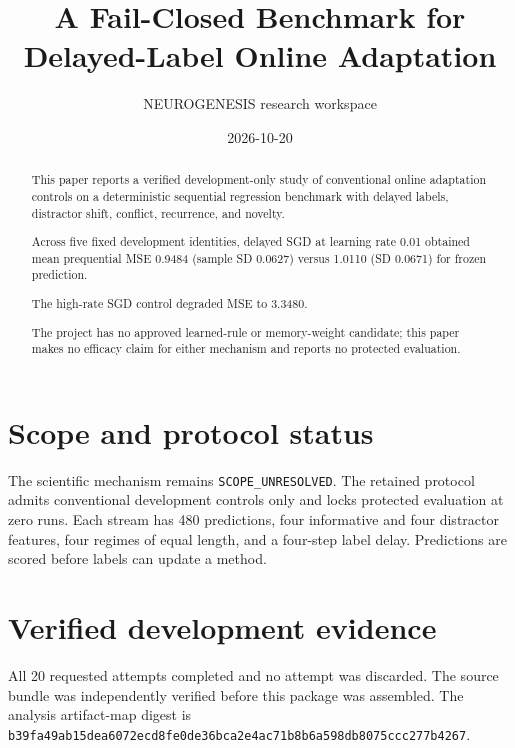 \documentclass[11pt]{article}
\title{A Fail-Closed Benchmark for Delayed-Label Online Adaptation}
\author{NEUROGENESIS research workspace}
\date{2026-10-20}
\begin{document}
\maketitle

\begin{abstract}

This paper reports a verified development-only study of conventional online adaptation controls on a deterministic sequential regression benchmark with delayed labels, distractor shift, conflict, recurrence, and novelty.

Across five fixed development identities, delayed SGD at learning rate 0.01 obtained mean prequential MSE 0.9484 (sample SD 0.0627) versus 1.0110 (SD 0.0671) for frozen prediction.

The high-rate SGD control degraded MSE to 3.3480.

The project has no approved learned-rule or memory-weight candidate; this paper makes no efficacy claim for either mechanism and reports no protected evaluation.

\end{abstract}

\section{Scope and protocol status}

The scientific mechanism remains \texttt{SCOPE\_UNRESOLVED}. The retained protocol admits conventional development controls only and locks protected evaluation at zero runs. Each stream has 480 predictions, four informative and four distractor features, four regimes of equal length, and a four-step label delay. Predictions are scored before labels can update a method.

\section{Verified development evidence}

All 20 requested attempts completed and no attempt was discarded. The source bundle was independently verified before this package was assembled. The analysis artifact-map digest is \texttt{b39fa49ab15dea6072ecd8fe0de36bca2e4ac71b8b6a598db8075ccc277b4267}.

\begin{table}[h]

\centering

\caption{Development-only conventional baseline results. Lower error is better.}

\label{tab:baseline}



\end{table}
\end{document}
